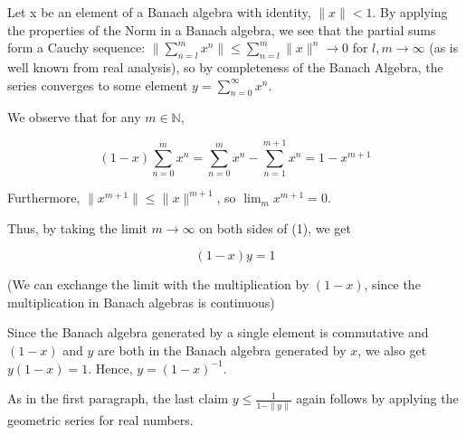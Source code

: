 \documentclass[12pt]{article}
\begin{document}
Let x be an element of a Banach algebra with identity, $\|x\| < 1$. By applying the properties of the Norm in a Banach algebra, we see that the partial sums form a Cauchy sequence: $\| \sum_{n=l}^m x^n \| \leq \sum_{n=l}^m \| x\|^n  \to 0$ for $l,m \to \infty$ (as is well known from real analysis), so by completeness of the Banach Algebra, the series converges to some element $y=\sum_{n=0}^\infty x^n$.

We observe that for any $m \in \mathbb{N}$,

\begin{equation}
(1-x) \sum_{n=0}^m x^n = \sum_{n=0}^m x^n - \sum_{n=1}^{m+1} x^n = 1-x^{m+1}
\end{equation}

Furthermore, $\| x^{m+1} \| \leq \| x \|^{m+1}$, so ${\lim}_m x^{m+1} = 0$.

Thus, by taking the limit $m \to \infty$ on both sides of (1), we get

$$(1-x) y = 1$$

(We can exchange the limit with the multiplication by $(1-x)$, since the multiplication in Banach algebras is continuous)

Since the Banach algebra generated by a single element is commutative and $(1-x)$ and $y$ are both in the Banach algebra generated by $x$, we also get $y (1-x) = 1$. Hence, $y = (1-x)^{-1}$.

As in the first paragraph, the last claim $y \leq \frac{1}{1-\|y\|}$ again follows by applying the geometric series for real numbers.
\end{document}
